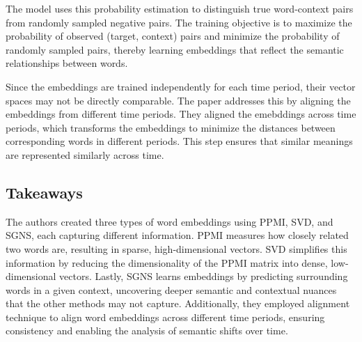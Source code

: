 The model uses this probability estimation to distinguish true word-context pairs from randomly sampled negative pairs.
The training objective is to maximize the probability of observed (target, context) pairs and minimize the probability of randomly sampled pairs, thereby learning embeddings that reflect the semantic relationships between words.

Since the embeddings are trained independently for each time period, their vector spaces may not be directly comparable.
The paper addresses this by aligning the embeddings from different time periods.
They aligned the emebddings across time periods, which transforms the embeddings to minimize the distances between corresponding words in different periods.
This step ensures that similar meanings are represented similarly across time.

\subsection{Takeaways}\label{subsec:hamilton_takeaways1}
The authors created three types of word embeddings using PPMI, SVD, and SGNS, each capturing different information.
PPMI measures how closely related two words are, resulting in sparse, high-dimensional vectors.
SVD simplifies this information by reducing the dimensionality of the PPMI matrix into dense, low-dimensional vectors.
Lastly, SGNS learns embeddings by predicting surrounding words in a given context, uncovering deeper semantic and contextual nuances that the other methods may not capture.
Additionally, they employed alignment technique to align word embeddings across different time periods, ensuring consistency and enabling the analysis of semantic shifts over time.

